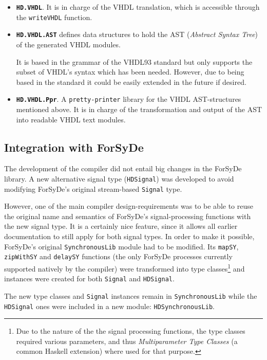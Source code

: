 \begin{itemize}
\item \texttt{\textbf{HD.VHDL}}. It is in charge of the VHDL translation,
  which is accessible through the \texttt{writeVHDL} function.

\item \texttt{\textbf{HD.VHDL.AST}} defines data structures to hold
  the AST (\textit{Abstract Syntax Tree}) of the generated VHDL modules.  

  It is based in the grammar of the VHDL93 standard but only supports
  the subset of VHDL's syntax which has been needed. However, due to
  being based in the standard it could be easily extended in the
  future if desired.
  
\item \texttt{\textbf{HD.VHDL.Ppr}}. A \texttt{pretty-printer} library
  for the VHDL AST-structures mentioned above. It is in charge of the
  transformation and output of the AST into readable VHDL text
  modules.

\end{itemize}

\subsection{Integration with ForSyDe}

The development of the compiler did not entail big changes in
the ForSyDe library. A new alternative signal type (\texttt{HDSignal})
was developed to avoid modifying ForSyDe's original stream-based
\texttt{Signal} type.

However, one of the main compiler design-requirements was to be able
to reuse the original name and semantics of ForSyDe's
signal-processing functions with the new signal type.  It is a
certainly nice feature, since it allows all earlier documentation to
still apply for both signal types. In order to make it possible,
ForSyDe's original \texttt{SynchronousLib} module had to be modified.
Its \texttt{mapSY}, \texttt{zipWithSY} and \texttt{delaySY} functions
(the only ForSyDe processes currently supported natively by the
compiler) were transformed into type classes\footnote{Due to the
  nature of the the signal processing functions, the type classes
  required various parameters, and thus \textit{Multiparameter Type
    Classes} (a common Haskell extension) where used for that
  purpose.} and instances were created for both \texttt{Signal} and
\texttt{HDSignal}.

The new type classes and \texttt{Signal} instances remain in
\texttt{SynchronousLib} while the \texttt{HDSignal} ones were included
in a new module: \texttt{HDSynchronousLib}.

